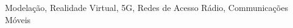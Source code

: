 \begin{palavraschave}
Modelação, Realidade Virtual, 5G, Redes de Acesso Rádio, Communicações Móveis
\end{palavraschave}
\clearpage
\thispagestyle{empty}
\cleardoublepage